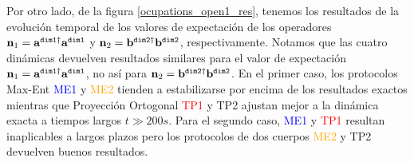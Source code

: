 \documentclass{report} %
\numberwithin{equation}{section}
\begin{document}
Por otro lado, de la figura \ref{ocupations_open1_res},  tenemos los resultados de la evolución temporal de los valores de expectación de los operadores ${\bf n}_1 = {\bf a}^{\texttt{dim1}\dagger} {\bf a}^{\texttt{dim1}}$ y ${\bf n}_2 = {\mathbf b}^{\texttt{dim2}\dagger} {\mathbf b}^{\texttt{dim2}}$, respectivamente. 
Notamos que las cuatro dinámicas devuelven resultados similares para el valor de expectación ${\bf n}_1 = {\bf a}^{\texttt{dim1}\dagger} {\bf a}^{\texttt{dim1}}$, no así para ${\bf n}_2 = {\mathbf b}^{\texttt{dim2}\dagger} {\mathbf b}^{\texttt{dim2}}$. En el primer caso, los protocolos Max-Ent \textcolor{blue}{ME1} y \textcolor{orange}{ME2} tienden a estabilizarse por encima de los resultados exactos mientras que Proyección Ortogonal \textcolor{red}{TP1} y \textcolor{dark green}{TP2} ajustan mejor a la dinámica exacta a tiempos largos $t\gg 200s$. Para el segundo caso, \textcolor{blue}{ME1} y \textcolor{red}{TP1} resultan inaplicables a largos plazos pero los protocolos de dos cuerpos \textcolor{orange}{ME2} y \textcolor{dark green}{TP2} devuelven buenos resultados.\\
\end{document}
